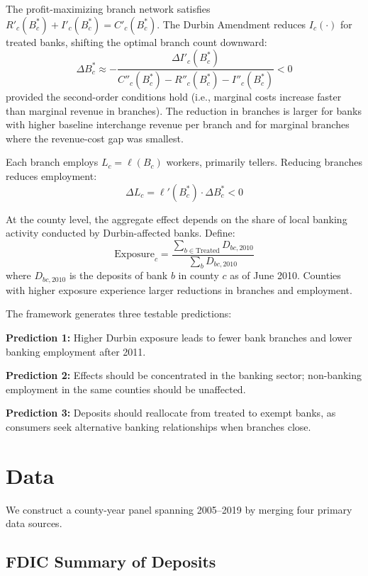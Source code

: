 \documentclass[12pt]{article}
\begin{document}
The profit-maximizing branch network satisfies $R'_c(B_c^*) + I'_c(B_c^*) = C'_c(B_c^*)$. The Durbin Amendment reduces $I_c(\cdot)$ for treated banks, shifting the optimal branch count downward:
\begin{equation}
\Delta B_c^* \approx -\frac{\Delta I'_c(B_c^*)}{C''_c(B_c^*) - R''_c(B_c^*) - I''_c(B_c^*)} < 0
\end{equation}
provided the second-order conditions hold (i.e., marginal costs increase faster than marginal revenue in branches). The reduction in branches is larger for banks with higher baseline interchange revenue per branch and for marginal branches where the revenue-cost gap was smallest.

Each branch employs $L_c = \ell(B_c)$ workers, primarily tellers. Reducing branches reduces employment:
\begin{equation}
\Delta L_c = \ell'(B_c^*) \cdot \Delta B_c^* < 0
\end{equation}

At the county level, the aggregate effect depends on the share of local banking activity conducted by Durbin-affected banks. Define:
\begin{equation}
\text{Exposure}_c = \frac{\sum_{b \in \text{Treated}} D_{bc,2010}}{\sum_{b} D_{bc,2010}}
\end{equation}
where $D_{bc,2010}$ is the deposits of bank $b$ in county $c$ as of June 2010. Counties with higher exposure experience larger reductions in branches and employment.

The framework generates three testable predictions:

\noindent\textbf{Prediction 1:} Higher Durbin exposure leads to fewer bank branches and lower banking employment after 2011.

\noindent\textbf{Prediction 2:} Effects should be concentrated in the banking sector; non-banking employment in the same counties should be unaffected.

\noindent\textbf{Prediction 3:} Deposits should reallocate from treated to exempt banks, as consumers seek alternative banking relationships when branches close.


\section{Data}\label{sec:data}

We construct a county-year panel spanning 2005--2019 by merging four primary data sources.

\subsection{FDIC Summary of Deposits}
\end{document}
